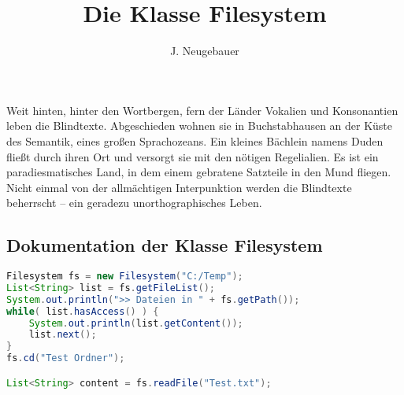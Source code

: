 \documentclass[a4paper,11pt]{scrartcl}
\author{J. Neugebauer}
\title{Die Klasse Filesystem}
\date{\Heute}
\begin{document}
\section*{\Titel}

Weit hinten, hinter den Wortbergen, fern der Länder Vokalien und Konsonantien leben die Blindtexte. Abgeschieden wohnen sie in Buchstabhausen an der Küste des Semantik, eines großen Sprachozeans. Ein kleines Bächlein namens Duden fließt durch ihren Ort und versorgt sie mit den nötigen Regelialien. Es ist ein paradiesmatisches Land, in dem einem gebratene Satzteile in den Mund fliegen. Nicht einmal von der allmächtigen Interpunktion werden die Blindtexte beherrscht – ein geradezu unorthographisches Leben.

\subsection*{Dokumentation der Klasse Filesystem}
\begin{klassenDoku}
\end{klassenDoku}

\begin{lstlisting}[language=Java]
Filesystem fs = new Filesystem("C:/Temp");
List<String> list = fs.getFileList();
System.out.println(">> Dateien in " + fs.getPath());
while( list.hasAccess() ) {
	System.out.println(list.getContent());
	list.next();
}
fs.cd("Test Ordner");

List<String> content = fs.readFile("Test.txt");
\end{lstlisting}
\end{document}
